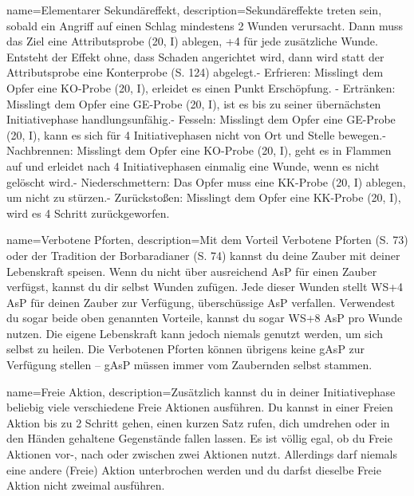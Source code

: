 {
    name={Elementarer Sekundäreffekt},
    description={Sekundäreffekte treten sein, sobald ein Angriff auf einen Schlag mindestens 2 Wunden verursacht. Dann muss das Ziel eine Attributsprobe (20, I) ablegen, +4 für jede zusätzliche Wunde. Entsteht der Effekt ohne, dass Schaden angerichtet wird, dann wird statt der Attributsprobe eine Konterprobe (S. 124) abgelegt.\newline - Erfrieren: Misslingt dem Opfer eine KO-Probe (20, I), erleidet es einen Punkt Erschöpfung. \newline - Ertränken: Misslingt dem Opfer eine GE-Probe (20, I), ist es bis zu seiner übernächsten Initiativephase handlungsunfähig.\newline - Fesseln: Misslingt dem Opfer eine GE-Probe (20, I), kann es sich für 4 Initiativephasen nicht von Ort und Stelle bewegen.\newline - Nachbrennen: Misslingt dem Opfer eine KO-Probe (20, I), geht es in Flammen auf und erleidet nach 4 Initiativephasen einmalig eine Wunde, wenn es nicht gelöscht wird.\newline - Niederschmettern: Das Opfer muss eine KK-Probe (20, I) ablegen, um nicht zu stürzen.\newline - Zurückstoßen: Misslingt dem Opfer eine KK-Probe (20, I), wird es 4 Schritt zurückgeworfen.}
}


{
    name={Verbotene Pforten},
    description={Mit dem Vorteil Verbotene Pforten (S. 73) oder der Tradition der Borbaradianer (S. 74) kannst du deine Zauber mit deiner Lebenskraft speisen. Wenn du nicht über ausreichend AsP für einen Zauber verfügst, kannst du dir selbst Wunden zufügen. Jede dieser Wunden stellt WS+4 AsP für deinen Zauber zur Verfügung, überschüssige AsP verfallen. Verwendest du sogar beide oben genannten Vorteile, kannst du sogar WS+8 AsP pro Wunde nutzen. Die eigene Lebenskraft kann jedoch niemals genutzt werden, um sich selbst zu heilen. Die Verbotenen Pforten können übrigens keine gAsP zur Verfügung stellen – gAsP müssen immer vom Zaubernden selbst stammen.}
}


{
    name={Freie Aktion},
    description={Zusätzlich kannst du in deiner Initiativephase beliebig viele verschiedene Freie Aktionen ausführen. Du kannst in einer Freien Aktion bis zu 2 Schritt gehen, einen kurzen Satz rufen, dich umdrehen oder in den Händen gehaltene Gegenstände fallen lassen. Es ist völlig egal, ob du Freie Aktionen vor-, nach oder zwischen zwei Aktionen nutzt. Allerdings darf niemals eine andere (Freie) Aktion unterbrochen werden und du darfst dieselbe Freie Aktion nicht zweimal ausführen.}
}


